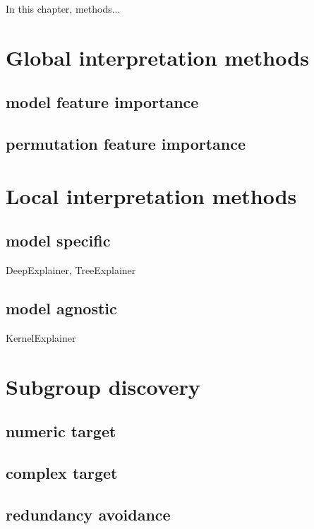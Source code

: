 In this chapter, methods...

\section{Global interpretation methods} 

\subsection{model feature importance}

\subsection{permutation feature importance}

\section{Local interpretation methods}

\subsection{model specific}
DeepExplainer, TreeExplainer

\subsection{model agnostic}
KernelExplainer

\section{Subgroup discovery}

\subsection{numeric target}

\subsection{complex target}

\subsection{redundancy avoidance}
